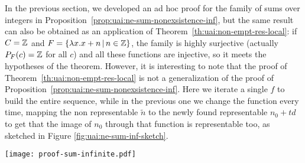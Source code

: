 \begin{remark}
	In the previous section, we developed an ad hoc proof for the family of sums over integers in Proposition~\ref{prop:uai:ne-sum-nonexsistence-inf}, but the same result can also be obtained as an application of Theorem~\ref{th:uai:non-empt-res-local}: if $C = \mathbb{Z}$ and $F = \{ \lambda x. x + n \,\vert\, n \in \mathbb{Z} \}$, the family is highly surjective (actually $P_F(c) = \mathbb{Z}$ for all $c$) and all these functions are injective, so it meets the hypotheses of the theorem.
	However, it is interesting to note that the proof of Theorem~\ref{th:uai:non-empt-res-local} is not a generalization of the proof of Proposition~\ref{prop:uai:ne-sum-nonexsistence-inf}. Here we iterate a single $f$ to build the entire sequence, while in the previous one we change the function every time, mapping the non representable $\tilde{n}$ to the newly found representable $n_0 + t d$ to get that the image of $n_0$ through that function is representable too, as sketched in Figure \ref{fig:uai:ne-sum-inf-sketch}.
	\begin{figure*}[ht]
		\centering
		\texttt{[image: proof-sum-infinite.pdf]}
		\caption{Graphical representation of the proof of Proposition~\ref{prop:uai:ne-sum-nonexsistence-inf}}
		\label{fig:uai:ne-sum-inf-sketch}
	\end{figure*}
\end{remark}

